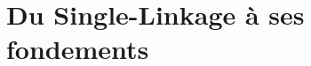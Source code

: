 \documentclass{these-ISSS} %
\begin{document}

{\hfuzz=100pt\vfuzz=100pt\maketitle}

\cleardoublepage



%


\tableofcontents
    
\mainmatter





% 








\part{Du Single-Linkage à ses fondements}
\end{document}
